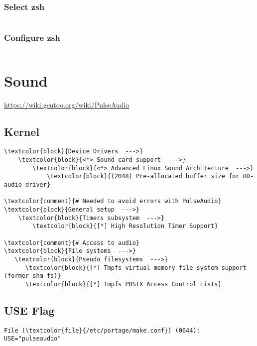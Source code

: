 \documentclass[10pt, a4paper, onecolumn, openany]{book}         %
\begin{document}
\subsection{Select zsh}
\begin{Verbatim}[commandchars=\\\{\}]

\end{Verbatim}


\subsection{Configure zsh}
\begin{Verbatim}[commandchars=\\\{\}]

\end{Verbatim}



\chapter{Sound}
\underline{\url{https://wiki.gentoo.org/wiki/PulseAudio}}\newline
\section{Kernel}
\begin{Verbatim}[commandchars=\\\{\}]
\textcolor{block}{Device Drivers  --->}
    \textcolor{block}{<*> Sound card support  --->}
        \textcolor{block}{<*> Advanced Linux Sound Architecture  --->}
            \textcolor{block}{(2048) Pre-allocated buffer size for HD-audio driver}

\textcolor{comment}{# Needed to avoid errors with PulseAudio}
\textcolor{block}{General setup  --->}
    \textcolor{block}{Timers subsystem  --->}
        \textcolor{block}{[*] High Resolution Timer Support}

\textcolor{comment}{# Access to audio}        
\textcolor{block}{File systems  --->}
   \textcolor{block}{Pseudo filesystems  --->}
      \textcolor{block}{[*] Tmpfs virtual memory file system support (former shm fs)}
      \textcolor{block}{[*] Tmpfs POSIX Access Control Lists}
\end{Verbatim}

\section{USE Flag}
\begin{Verbatim}[commandchars=\\\{\}]
File (\textcolor{file}{/etc/portage/make.conf}) (0644):
USE="pulseaudio"

\end{Verbatim}
\end{document}
